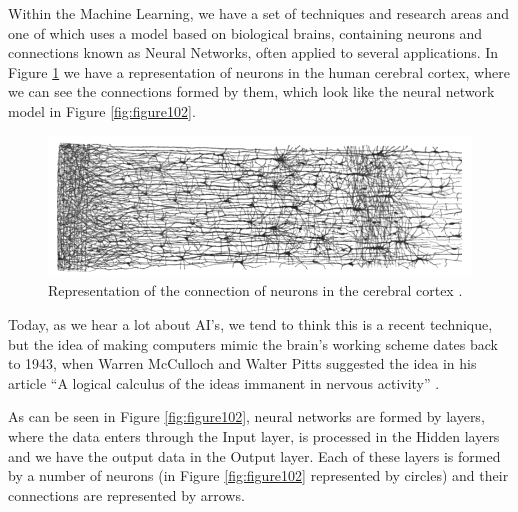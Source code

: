 Within the Machine Learning, we have a set of techniques and research areas and one of which uses a model based on biological brains, containing neurons and connections known as Neural Networks, often applied to several applications. In Figure  \ref{fig:figure101} we have a representation of neurons in the human cerebral cortex, where we can see the connections formed by them, which look like the neural network model in Figure \ref{fig:figure102}.

\begin{figure}
    \centering
    \includegraphics[scale=0.30]{"Part 3 - Learning Systems/Introduction/figure101.png"}
    \caption{Representation of the connection of neurons in the cerebral cortex \cite{cajal}.}
    \label{fig:figure101}
\end{figure}

Today, as we hear a lot about AI's, we tend to think this is a recent technique, but the idea of making computers mimic the brain's working scheme dates back to 1943, when Warren McCulloch and Walter Pitts suggested the idea in his article “A logical calculus of the ideas immanent in nervous activity” \cite{mcculloch1943}.

As can be seen in Figure \ref{fig:figure102}, neural networks are formed by layers, where the data enters through the Input layer, is processed in the Hidden layers and we have the output data in the Output layer. Each of these layers is formed by a number of neurons (in Figure \ref{fig:figure102} represented by circles) and their connections are represented by arrows.

